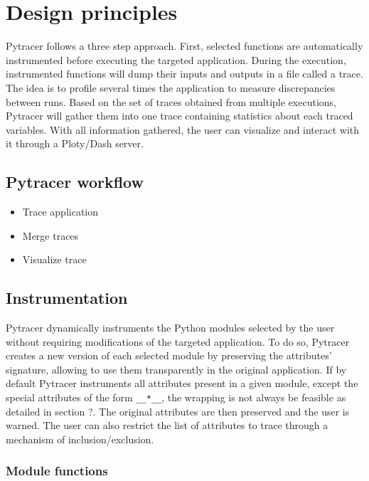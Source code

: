 \documentclass[acmconf,authordraft,anonymous,review]{acmart}
\newcommand{\Yohan}[1]{\todo[inline,backgroundcolor=green]{YC:#1}}
\begin{document}
\section{Design principles}

Pytracer follows a three step approach. First, selected functions are automatically
instrumented before executing the targeted application. During the execution, instrumented
functions will dump their inputs and outputs in a file called a trace. 
The idea is to profile several times the application to measure discrepancies between runs.
Based on the set of traces obtained from multiple executions, Pytracer 
will gather them into one trace containing statistics about each traced variables.
With all information gathered, the user can visualize and interact with it through a Ploty/Dash server.

\subsection{Pytracer workflow}

\Yohan{Add figure for the workflow}

\begin{itemize}
    \item Trace application
    \item Merge traces
    \item Visualize trace
\end{itemize}

\subsection{Instrumentation}
Pytracer dynamically instruments the Python modules selected by the user
without requiring modifications of the targeted application.
To do so, Pytracer creates a new version of each selected module 
by preserving the attributes' signature, allowing to use them
transparently in the original application.
If by default Pytracer instruments all attributes present
in a given module, except the special attributes of the form \texttt{\_\_*\_\_},
the wrapping is not always be feasible as detailed in section ?.
The original attributes are then preserved and the user is warned.
The user can also restrict the list of attributes to trace through
a mechanism of inclusion/exclusion.

\subsubsection{Module functions}
\end{document}
